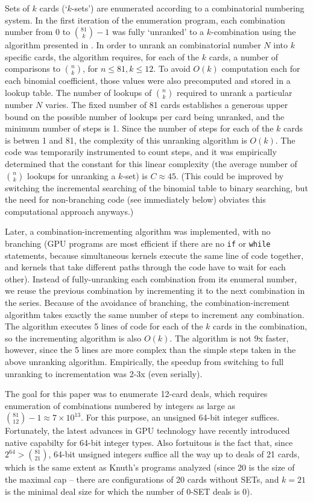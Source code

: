 \documentclass[10pt]{amsart}
\begin{document}
Sets of $k$ cards (`$k$-sets') are enumerated according to a combinatorial
numbering system. In the first iteration of the enumeration program, each
combination number from 0 to $\binom{81}{k}-1$ was fully `unranked' to a
$k$-combination using the algorithm presented in \cite{WIKI}. In order to unrank
an combinatorial number $N$ into $k$ specific cards, the algorithm requires, for
each of the $k$ cards, a number of comparisons to $\binom{n}{k}$, for $n\le 81,
k\le 12$. To avoid $O(k)$ computation each for each binomial coefficient, those
values were also precomputed and stored in a lookup table. The number of lookups
of $\binom{n}{k}$ required to unrank a particular number $N$ varies. The fixed
number of 81 cards establishes a generous upper bound on the possible number of
lookups per card being unranked, and the minimum number of steps is 1. Since the
number of steps for each of the $k$ cards is betwen 1 and 81, the complexity of
this unranking algorithm is $O(k)$. The code was temporarily instrumented to
count steps, and it was empirically determined that the constant for this linear
complexity (the average number of $\binom{n}{k}$ lookups for unranking a
$k$-set) is $C\approx 45$. (This could be improved by switching the incremental
searching of the binomial table to binary searching, but the need for
non-branching code (see immediately below) obviates this computational approach
anyways.)

Later, a combination-incrementing algorithm was implemented, with no branching
(GPU programs are most efficient if there are no {\tt if} or {\tt while}
statements, because simultaneous kernels execute the same line of code together,
and kernels that take different paths through the code have to wait for each
other). Instead of fully-unranking each combination from its enumeral number, we
reuse the previous combination by incrementing it to the next combination in the
series. Because of the avoidance of branching, the combination-increment
algorithm takes exactly the same number of steps to increment any
combination. The algorithm executes 5 lines of code for each of the $k$ cards in
the combination, so the incrementing algorithm is also $O(k)$. The algorithm is
not 9x faster, however, since the 5 lines are more complex than the simple steps
taken in the above unranking algorithm. Empirically, the speedup from switching
to full unranking to incrementation was 2-3x (even serially).

The goal for this paper was to enumerate 12-card deals, which requires
enumeration of combinations numbered by integers as large as $\binom{81}{12}-1
\approx 7\times 10^{13}$. For this purpose, an unsigned 64-bit integer
suffices. Fortunately, the latest advances in GPU technology have recently
introduced native capabilty for 64-bit integer types. Also fortuitous is the
fact that, since $2^{64} > \binom{81}{21}$, 64-bit unsigned integers suffice all
the way up to deals of 21 cards, which is the same extent as Knuth's programs
analyzed (since 20 is the size of the maximal cap -- there are configurations of
20 cards without SETs, and $k=21$ is the minimal deal size for which the number
of 0-SET deals is 0).
\end{document}
